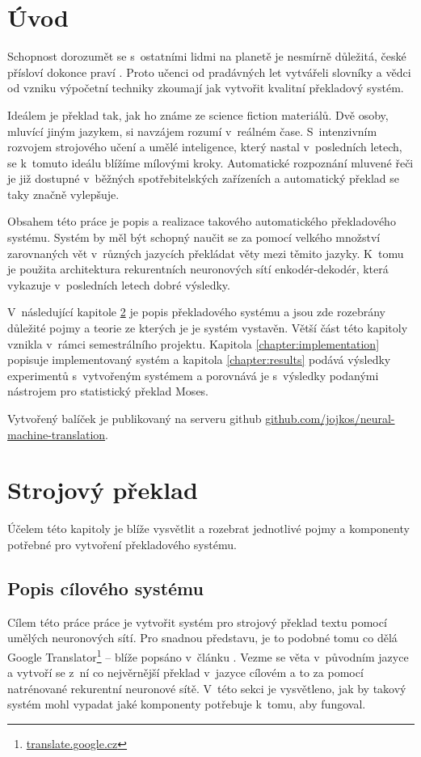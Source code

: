 \chapter{Úvod}
Schopnost dorozumět se s~ostatními lidmi na planetě je nesmírně důležitá, české přísloví dokonce praví . Proto učenci od pradávných let vytvářeli slovníky a vědci od vzniku výpočetní techniky zkoumají jak vytvořit kvalitní překladový systém.

Ideálem je překlad tak, jak ho známe ze science fiction materiálů. Dvě osoby, mluvící jiným jazykem, si navzájem rozumí v~reálném čase. S~intenzivním rozvojem strojového učení a umělé inteligence, který nastal v~posledních letech, se k~tomuto ideálu blížíme mílovými kroky. Automatické rozpoznání mluvené řeči je již dostupné v~běžných spotřebitelských zařízeních a automatický překlad se taky značně vylepšuje.

Obsahem této práce je popis a realizace takového automatického překladového systému. Systém by měl být schopný naučit se za pomocí velkého množství zarovnaných vět v~různých jazycích překládat věty mezi těmito jazyky. K~tomu je použita architektura rekurentních neuronových sítí enkodér-dekodér, která vykazuje v~posledních letech dobré výsledky.

V~následující kapitole \ref{chapter:theory} je popis překladového systému a jsou zde rozebrány důležité pojmy a teorie ze kterých je je systém vystavěn. Větší část této kapitoly vznikla v~rámci semestrálního projektu. Kapitola \ref{chapter:implementation} popisuje implementovaný systém a kapitola \ref{chapter:results} podává výsledky experimentů s~vytvořeným systémem a porovnává je s~výsledky podanými nástrojem pro statistický překlad Moses.

Vytvořený balíček je publikovaný na serveru github \url{github.com/jojkos/neural-machine-translation}.


\chapter{Strojový překlad}\label{chapter:theory}
Účelem této kapitoly je blíže vysvětlit a rozebrat jednotlivé pojmy a komponenty potřebné pro vytvoření překladového systému.

\section{Popis cílového systému} \label{chapter:draft}
Cílem této práce práce je vytvořit systém pro strojový překlad textu pomocí umělých neuronových sítí. Pro snadnou představu, je to podobné tomu co dělá Google Translator\footnote{\url{translate.google.cz}} -- blíže popsáno v~článku \cite{googleBridgingGap}. Vezme se věta v~původním jazyce a vytvoří se z~ní co nejvěrnější překlad v~jazyce cílovém a to za pomocí natrénované rekurentní neuronové sítě. V~této sekci je vysvětleno, jak by takový systém mohl vypadat jaké komponenty potřebuje k~tomu, aby fungoval.

